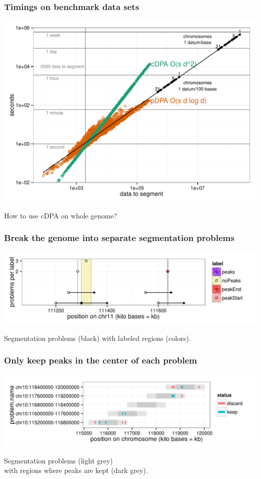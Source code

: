 \documentclass{beamer}
\begin{document}
\begin{frame}
  \frametitle{Timings on benchmark data sets}
  \includegraphics[width=\textwidth]{figure-cDPA-pDPA-timings}

  How to use cDPA on whole genome?
\end{frame}

\begin{frame}
  \frametitle{Break the genome into separate segmentation problems}
  \includegraphics[width=\textwidth]{figure-overlapping-problems}

  Segmentation problems (black) with labeled regions (colors).
\end{frame}

\begin{frame}
  \frametitle{Only keep peaks in the center of each problem}
  \includegraphics[width=\textwidth]{figure-multires-bins-overlap}

  Segmentation problems (light grey) \\
  with regions where peaks are kept (dark grey).
\end{frame}
\end{document}

